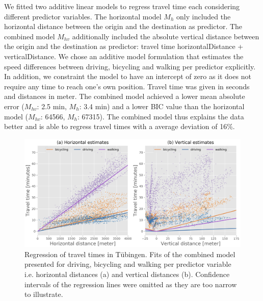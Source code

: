 \documentclass{article}
\begin{document}
We fitted two additive linear models to regress travel time each considering different predictor variables. The horizontal model $M_h$ only included the horizontal distance between the origin and the destination as predictor. The combined model $M_{hv}$ additionally included the absolute vertical distance between the origin and the destination as predictor: travel time \raisebox{-0.9ex}{\~{}} horizontalDistance + verticalDistance. We chose an additive model formulation that estimates the speed differences between driving, bicycling and walking per predictor explicitly. In addition, we constraint the model to have an intercept of zero as it does not require any time to reach one's own position. Travel time was given in seconds and distances in meter. The combined model achieved a lower mean absolute error ($M_{hv}$: 2.5 min, $M_{h}$: 3.4 min) and a lower BIC value than the horizontal model ($M_{hv}$: 64566, $M_{h}$: 67315). The combined model thus explains the data better and is able to regress travel times with a average deviation of 16\%. 

\begin{figure}[h]
  \centering
  \includegraphics[width=\linewidth]{fig/RegressionPlots_CombinedEstimates.png}
  \caption{Regression of travel times in Tübingen. Fits of the combined model presented for driving, bicycling and walking per predictor variable i.e. horizontal distances (a) and vertical distances (b). Confidence intervals of the regression lines were omitted as they are too narrow to illustrate.}
  \label{fig:regression}
\end{figure}
\end{document}
